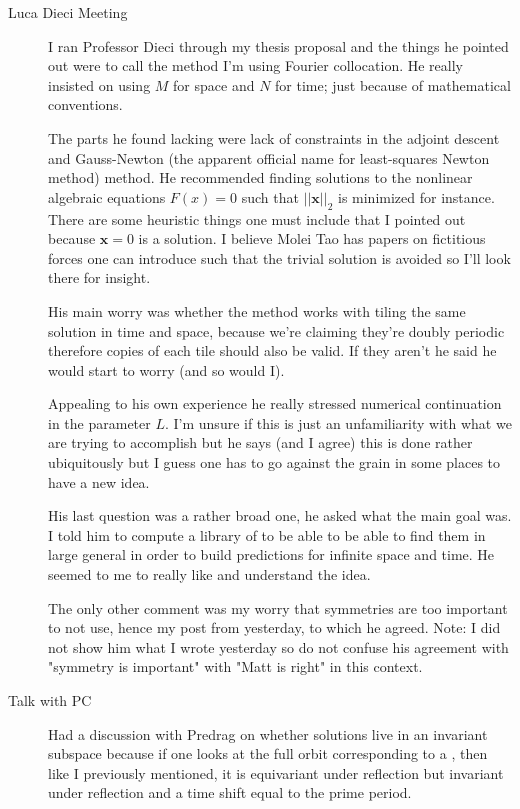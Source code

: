 \begin{description}
{\begin{description}
\item[Luca Dieci Meeting]
I ran Professor Dieci through my thesis proposal and the things he pointed out were to call
the method I'm using Fourier collocation. He really insisted on using $M$ for space and $N$
for time; just because of mathematical conventions.

The parts he found lacking were lack of constraints in the adjoint descent and Gauss-Newton (the apparent
official name for least-squares Newton method) method. He recommended finding solutions to the
nonlinear algebraic equations $F(x)=0$ such that $||\mathbf{x}||_2$ is minimized for instance. There are
some heuristic things one must include that I pointed out because $\mathbf{x}=0$ is a solution. I believe
Molei Tao has papers on fictitious forces one can introduce such that the trivial solution is avoided so
I'll look there for insight.

His main worry was whether the method works with tiling the same solution in time and space, because
we're claiming they're doubly periodic therefore copies of each tile should also be valid. If they
aren't he said he would start to worry (and so would I).

Appealing to his own experience he really stressed numerical continuation in the parameter $L$.
I'm unsure if this is just an unfamiliarity with what we are trying to accomplish but he says (and
I agree) this is done rather ubiquitously but I guess one has to go against the grain in some places
to have a new idea.

His last question was a rather broad one, he asked what the main goal was. I told him to compute a
library of {\twots} to be able to be able to find them in large general {\twots} in order to build predictions for infinite space and time. He seemed to me to really like
and understand the idea.

The only other comment was my worry that symmetries are too important to not use, hence my post from
yesterday, to which he agreed. { \color{red} Note: I did not show him what I wrote yesterday so do not confuse
his agreement with "symmetry is important" with "Matt is right" in this context.}


\item[Talk with PC]
Had a discussion with Predrag on whether \ppo solutions live in an invariant subspace because if one looks
at the full {\statesp} orbit corresponding to a \ppo, then like I previously mentioned,
it is equivariant under reflection but invariant under reflection and a time shift equal to the prime
period.


\end{description}}
\end{description}
